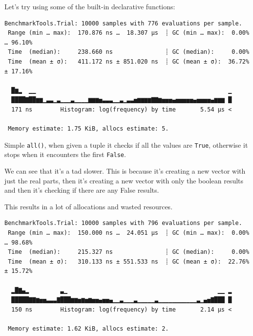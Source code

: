 \documentclass[
  8pt,
  a4paper,
]{book}
\newenvironment{Shaded}{\begin{snugshade}}{\end{snugshade}}
\newcommand{\FloatTok}[1]{\textcolor[rgb]{0.68,0.00,0.00}{#1}}
\newcommand{\FunctionTok}[1]{\textcolor[rgb]{0.28,0.35,0.67}{#1}}
\newcommand{\NormalTok}[1]{\textcolor[rgb]{0.00,0.23,0.31}{#1}}
\newcommand{\OperatorTok}[1]{\textcolor[rgb]{0.37,0.37,0.37}{#1}}
\newcommand{\PreprocessorTok}[1]{\textcolor[rgb]{0.68,0.00,0.00}{#1}}
\begin{document}
Let's try using some of the built-in declarative functions:

\begin{Shaded}
\end{Shaded}

\begin{verbatim}
BenchmarkTools.Trial: 10000 samples with 776 evaluations per sample.
 Range (min … max):  170.876 ns …  18.307 μs  ┊ GC (min … max):  0.00% … 96.10%
 Time  (median):     238.660 ns               ┊ GC (median):     0.00%
 Time  (mean ± σ):   411.172 ns ± 851.020 ns  ┊ GC (mean ± σ):  36.72% ± 17.16%

  █▆▂  ▁▁                                                       ▁
  ████▇██▆▆▁▃▃▁▃▁▁▁▃▁▁▁▁▆▆▆▅▃▃▃▁▁▃▁▃▃▅▆▆▆▆▇▇▆▅▅▅▄▅▅▅▅▅▄▅▅▅▅▄▆▆▆ █
  171 ns        Histogram: log(frequency) by time       5.54 μs <

 Memory estimate: 1.75 KiB, allocs estimate: 5.
\end{verbatim}

Simple \texttt{all()}, when given a tuple it checks if all the values
are \texttt{True}, otherwise it stops when it encounters the first
\texttt{False}.

We can see that it's a tad slower. This is because it's creating a new
vector with just the real parts, then it's creating a new vector with
only the boolean results and then it's checking if there are any False
results.

This results in a lot of allocations and wasted resources.

\begin{Shaded}
\end{Shaded}

\begin{verbatim}
BenchmarkTools.Trial: 10000 samples with 796 evaluations per sample.
 Range (min … max):  150.000 ns …  24.051 μs  ┊ GC (min … max):  0.00% … 98.68%
 Time  (median):     215.327 ns               ┊ GC (median):     0.00%
 Time  (mean ± σ):   310.133 ns ± 551.533 ns  ┊ GC (mean ± σ):  22.76% ± 15.72%

  ▂█▇▄▂         ▃▁                                           ▁▁ ▂
  █████▇▇▆▅▅▃▃▃▇███▆▆▅▆▅▆▅▅▄▅▅▄▁▁▃▁▁▁▃▁▁▁▁▁▃▁▁▁▁▁▁▁▁▁▁▁▃▁▄▅▇███ █
  150 ns        Histogram: log(frequency) by time       2.14 μs <

 Memory estimate: 1.62 KiB, allocs estimate: 2.
\end{verbatim}
\end{document}
